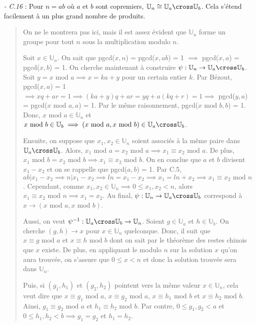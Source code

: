 \textit{- C.16} : Pour $n=ab$ où $a$ et $b$ sont copremiers, $\mathbb{U}_n \cong \mathbb{U}_a \cross \mathbb{U}_b$. Cela s'étend facilement à un plus grand nombre de produits.

\begin{quote}
    On ne le montrera pas ici, mais il est assez évident que $\mathbb{U}_n$ forme un groupe pour tout $n$ sous la multiplication modulo $n$.

    Soit $x \in \mathbb{U}_n$. On sait que pgcd($x,n$) = pgcd($x, ab$) = 1 $\implies$ pgcd($x,a$) = pgcd($x,b$) = 1. On cherche maintenant à construire $\psi : \mathbb{U}_n \rightarrow \mathbb{U}_a \cross \mathbb{U}_b$. Soit $y = x \text{ mod } a \implies x = ka + y$ pour un certain entier $k$. Par Bézout, pgcd($x,a$) = 1 $\implies xq + ar = 1 \implies (ka + y)q + ar = yq + a(kq+r) = 1 \implies$ pgcd($y,a$) = pgcd($x \text{ mod } a, a$) = 1. Par le même raisonnement, pgcd($x \text{ mod } b, b$) = 1. Donc, $x \text{ mod } a \in \mathbb{U}_a$ et $x \text{ mod } b \in \mathbb{U}_b \implies (x \text{ mod } a, x \text{ mod } b) \in \mathbb{U}_a \cross \mathbb{U}_b$.
    
    Ensuite, on suppose que $x_1, x_2 \in \mathbb{U}_n$ soient associés à la même paire dans $\mathbb{U}_a \cross \mathbb{U}_b$. Alors, $x_1 \text{ mod } a = x_2 \text{ mod } a \implies x_1 \equiv x_2 \text{ mod } a$. De plus, $x_1 \text{ mod } b = x_2 \text{ mod } b \implies x_1 \equiv x_2 \text{ mod } b$. On en conclue que $a$ et $b$ divisent $x_1 - x_2$ et on se rappelle que pgcd($a,b$) = 1. Par C.5, $ab|x_1 - x_2 \implies n|x_1 - x_2 \implies ln = x_1 - x_2 \implies x_1 = ln + x_2 \implies x_1 \equiv x_2 \text{ mod } n$. Cependant, comme $x_1, x_2 \in \mathbb{U}_n \implies 0 \leq x_1,x_2 < n$, alors $x_1 \equiv x_2 \text{ mod } n \implies x_1 = x_2$. Au final, $\psi : \mathbb{U}_n \rightarrow \mathbb{U}_a \cross \mathbb{U}_b$ correspond à $x \rightarrow (x \text{ mod } a, x \text{ mod } b)$.
    
    Aussi, on veut $\psi^{-1} : \mathbb{U}_a \cross \mathbb{U}_b \rightarrow \mathbb{U}_n$. Soient $g \in \mathbb{U}_a$ et $h \in \mathbb{U}_b$. On cherche $(g,h) \rightarrow x$ pour $x \in \mathbb{U}_n$ quelconque. Donc, il suit que $x \equiv g \text{ mod } a$ et $x \equiv h \text{ mod } b$ dont on sait par le théorème des restes chinois que $x$ existe. De plus, en appliquant le modulo $n$ sur la solution $x$ qu'on aura trouvée, on s'assure que $0 \leq x < n$ et donc la solution trouvée sera dans $\mathbb{U}_n$.
    
    Puis, si $(g_1, h_1)$ et $(g_2, h_2)$ pointent vers la même valeur $x \in \mathbb{U}_n$, cela veut dire que $x \equiv g_1 \text{ mod } a$, $x \equiv g_2 \text{ mod } a$,  $x \equiv h_1 \text{ mod } b$ et $x \equiv h_2 \text{ mod } b$. Ainsi, $g_1 \equiv g_2 \text{ mod } a$ et $h_1 \equiv h_2 \text{ mod } b$. Par contre, $0 \leq g_1,g_2 < a$ et $0 \leq h_1,h_2 < b \implies g_1 = g_2$ et $h_1 = h_2$.


\end{quote}
